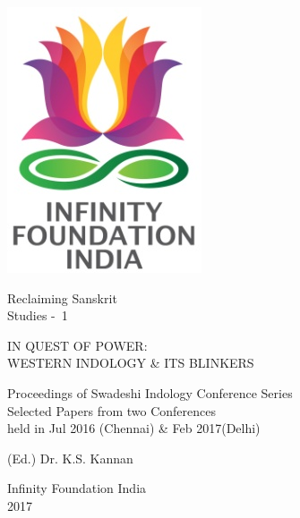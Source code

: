 \thispagestyle{empty}
\begin{center}
\includegraphics[scale=0.3]{figures/logo.png}

{\fontsize{24}{26}\selectfont
Reclaiming Sanskrit\\[4pt] Studies - 1}
\end{center}
\vfill

\begin{center}
{\fontsize{16}{18}\selectfont 
IN QUEST OF POWER:\\[4pt]
WESTERN INDOLOGY \& ITS BLINKERS
}
\vfill

Proceedings of Swadeshi Indology Conference Series\\[4pt]
Selected Papers from two Conferences\\[4pt]
held in Jul 2016 (Chennai) \& Feb 2017(Delhi)
\vfill

{\fontsize{14}{18}\selectfont 
(Ed.) Dr. K.S. Kannan\par
}
\vfill

{\fontsize{12}{14}\selectfont
Infinity Foundation India\\[4pt]
2017}
\end{center}




